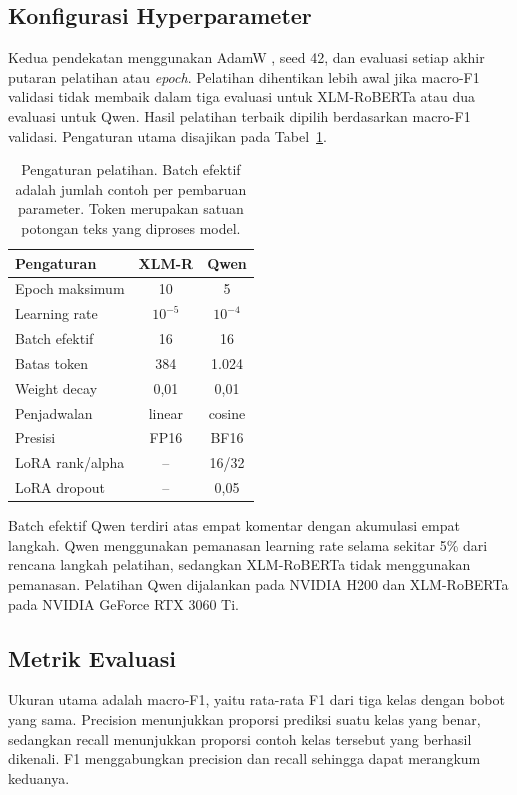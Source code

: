 \documentclass[11pt]{article}
\begin{document}
\subsection{Konfigurasi Hyperparameter}
Kedua pendekatan menggunakan AdamW \citep{loshchilov-hutter-2019-decoupled}, seed 42, dan evaluasi setiap akhir putaran pelatihan atau \textit{epoch}. Pelatihan dihentikan lebih awal jika macro-F1 validasi tidak membaik dalam tiga evaluasi untuk XLM-RoBERTa atau dua evaluasi untuk Qwen. Hasil pelatihan terbaik dipilih berdasarkan macro-F1 validasi. Pengaturan utama disajikan pada Tabel~\ref{tab:hyper}.

\begin{table}[t]
\centering
\small
\setlength{\tabcolsep}{3pt}
\begin{tabular}{lcc}
\toprule
Pengaturan & XLM-R & Qwen \\
\midrule
Epoch maksimum & 10 & 5 \\
Learning rate & $10^{-5}$ & $10^{-4}$ \\
Batch efektif & 16 & 16 \\
Batas token & 384 & 1.024 \\
Weight decay & 0,01 & 0,01 \\
Penjadwalan & linear & cosine \\
Presisi & FP16 & BF16 \\
LoRA rank/alpha & -- & 16/32 \\
LoRA dropout & -- & 0,05 \\
\bottomrule
\end{tabular}
\caption{Pengaturan pelatihan. Batch efektif adalah jumlah contoh per pembaruan parameter. Token merupakan satuan potongan teks yang diproses model.}
\label{tab:hyper}
\end{table}

Batch efektif Qwen terdiri atas empat komentar dengan akumulasi empat langkah. Qwen menggunakan pemanasan learning rate selama sekitar 5\% dari rencana langkah pelatihan, sedangkan XLM-RoBERTa tidak menggunakan pemanasan. Pelatihan Qwen dijalankan pada NVIDIA H200 dan XLM-RoBERTa pada NVIDIA GeForce RTX 3060 Ti.

\subsection{Metrik Evaluasi}
Ukuran utama adalah macro-F1, yaitu rata-rata F1 dari tiga kelas dengan bobot yang sama. Precision menunjukkan proporsi prediksi suatu kelas yang benar, sedangkan recall menunjukkan proporsi contoh kelas tersebut yang berhasil dikenali. F1 menggabungkan precision dan recall sehingga dapat merangkum keduanya.
\end{document}
